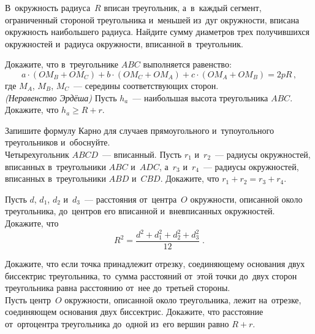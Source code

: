 \begin{problems}
\item
В~окружность радиуса~$R$ вписан треугольник, а~в~каждый сегмент, ограниченный
стороной треугольника и~меньшей из~дуг окружности, вписана окружность
наибольшего радиуса.
Найдите сумму диаметров трех получившихся окружностей и~радиуса окружности,
вписанной в~треугольник.

\item
\subproblem
Докажите, что в~треугольнике $ABC$ выполняется равенство:
\[
    a \cdot (O M_{B} + O M_{C})
    +
    b \cdot (O M_{C} + O M_{A})
    +
    c \cdot (O M_{A} + O M_{B})
=
    2 p R
\, , \]
где $M_A$, $M_B$, $M_C$~--- середины соответствующих сторон.
\\
\subproblem \emph{(Неравенство Эрдёша)}
Пусть $h_{a}$~--- наибольшая высота треугольника $ABC$.
Докажите, что $h_{a} \geq R + r$.

\item
\subproblem
Запишите формулу Карно для случаев прямоугольного и~тупоугольного треугольников
и~обоснуйте.
\\
\subproblem
Четырехугольник $ABCD$~--- вписанный.
Пусть $r_1$ и~$r_2$~--- радиусы окружностей, вписанных в~треугольники $ABC$
и~$ADC$, а~$r_3$ и~$r_4$~--- радиусы окружностей, вписанных в~треугольники
$ABD$ и~$CBD$.
Докажите, что $r_1 + r_2 = r_3 + r_4$.

\item
Пусть $d$, $d_1$, $d_2$ и~$d_3$~--- расстояния от~центра~$O$ окружности,
описанной около треугольника, до~центров его вписанной и~вневписанных
окружностей.
Докажите, что
\[
    R^2
=
    \frac{d^2 + d_1^2 + d_2^2 + d_3^2}{12}
\; . \]

\item
\subproblem
Докажите, что если точка принадлежит отрезку, соединяющему основания двух
биссектрис треугольника, то~сумма расстояний от~этой точки до~двух сторон
треугольника равна расстоянию от~нее до~третьей стороны.
\\
\subproblem
Пусть центр~$O$ окружности, описанной около треугольника, лежит на~отрезке,
соединяющем основания двух биссектрис.
Докажите, что расстояние от~ортоцентра треугольника до~одной из~его вершин
равно $R + r$.

\end{problems}

